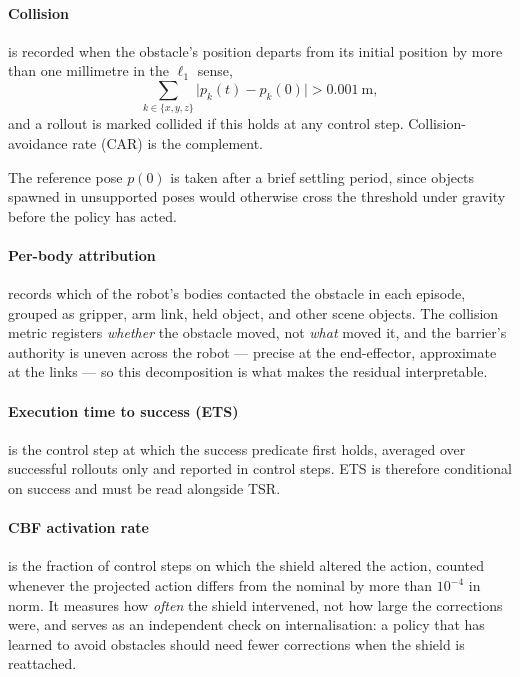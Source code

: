 \documentclass[a4paper,11pt]{report}
\begin{document}
\paragraph{Collision} is recorded when the obstacle's position departs from its initial position by more than one millimetre in the $\ell_1$ sense,
\begin{equation}
  \sum_{k \in \{x,y,z\}} \bigl| p_k(t) - p_k(0) \bigr| > 0.001~\mathrm{m},
  \label{eq:collision}
\end{equation}
and a rollout is marked collided if this holds at any control step. Collision-avoidance rate (CAR) is the complement. 

The reference pose $p(0)$ is taken after a brief settling period, since objects spawned in
unsupported poses would otherwise cross the threshold under gravity before the policy has acted.


\paragraph{Per-body attribution}\label{sec:attribution} records which of the robot's bodies
contacted the obstacle in each episode, grouped as gripper, arm link, held object, and other scene
objects. The collision metric registers \emph{whether} the obstacle moved, not \emph{what} moved it,
and the barrier's authority is uneven across the robot --- precise at the end-effector, approximate
at the links --- so this decomposition is what makes the residual interpretable.

\paragraph{Execution time to success (ETS)} is the control step at which the success predicate
first holds, averaged over successful rollouts only and reported in control steps. ETS is therefore conditional on success and must be read
alongside TSR.

\paragraph{CBF activation rate} is the fraction of control steps on which the shield altered the
action, counted whenever the projected action differs from the nominal by more than $10^{-4}$ in
norm. It measures how \emph{often} the shield intervened, not how large the corrections were, and
serves as an independent check on internalisation: a policy that has learned to avoid obstacles
should need fewer corrections when the shield is reattached.
\end{document}
